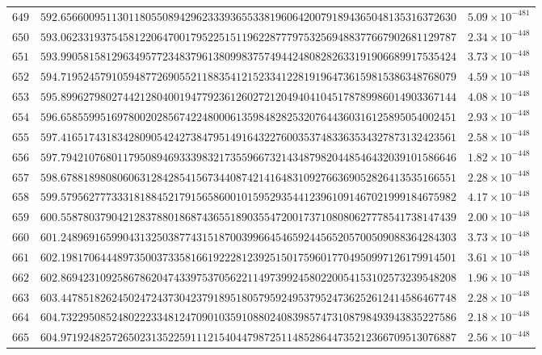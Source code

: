\documentclass[12pt,reqno]{amsart}
\theoremstyle{remark}
\begin{document}
\begin{longtable}{clc}
$649$ & $592.6566009511301180550894296233393655338196064200791894365048135316372630$ & $5.09\times 10^{-481}$ \\
$650$ & $593.0623319375458122064700179522515119622877797532569488377667902681129787$ & $2.34\times 10^{-448}$ \\
$651$ & $593.9905815812963495772348379613809983757494424808282633191906689917535424$ & $3.73\times 10^{-448}$ \\
$652$ & $594.7195245791059487726905521188354121523341228191964736159815386348768079$ & $4.59\times 10^{-448}$ \\
$653$ & $595.8996279802744212804001947792361260272120494041045178789986014903367144$ & $4.08\times 10^{-448}$ \\
$654$ & $596.6585599516978002028567422480006135984828253207644360316125895054002451$ & $2.93\times 10^{-448}$ \\
$655$ & $597.4165174318342809054242738479514916432276003537483363534327873132423561$ & $2.58\times 10^{-448}$ \\
$656$ & $597.7942107680117950894693339832173559667321434879820448546432039101586646$ & $1.82\times 10^{-448}$ \\
$657$ & $598.6788189808060631284285415673440874214164831092766369052826413535166551$ & $2.28\times 10^{-448}$ \\
$658$ & $599.5795627773331818845217915658600101595293544123961091467021999184675982$ & $4.17\times 10^{-448}$ \\
$659$ & $600.5587803790421283788018687436551890355472001737108080627778541738147439$ & $2.00\times 10^{-448}$ \\
$660$ & $601.2489691659904313250387743151870039966454659244565205700509088364284303$ & $3.73\times 10^{-448}$ \\
$661$ & $602.1981706444897350037335816619222812392515017596017704950997126179914501$ & $3.61\times 10^{-448}$ \\
$662$ & $602.8694231092586786204743397537056221149739924580220054153102573239548208$ & $1.96\times 10^{-448}$ \\
$663$ & $603.4478518262450247243730423791895180579592495379524736252612414586467748$ & $2.28\times 10^{-448}$ \\
$664$ & $604.7322950852480222334812470901035910880240839857473108798493943835227586$ & $2.18\times 10^{-448}$ \\
$665$ & $604.9719248257265023135225911121540447987251148528644735212366709513076887$ & $2.56\times 10^{-448}$ \\

\end{longtable}
\end{document}
